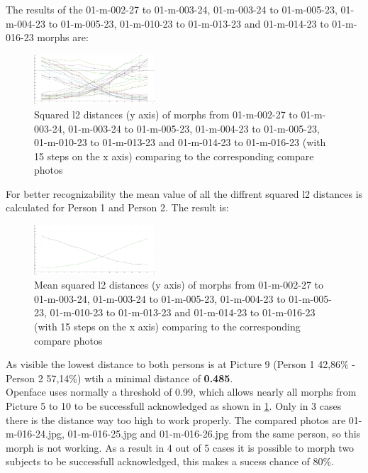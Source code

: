 The results of the 01-m-002-27 to 01-m-003-24, 01-m-003-24 to 01-m-005-23, 01-m-004-23 to 01-m-005-23, 01-m-010-23 to 01-m-013-23 and 01-m-014-23 to 01-m-016-23 morphs are:
\begin{figure}[htbp] 
	\centering
	\includegraphics[width=0.4\textwidth]{Resources/result1-5.jpg}
	\caption{Squared l2 distances (y axis) of morphs from 01-m-002-27 to 01-m-003-24, 01-m-003-24 to 01-m-005-23, 01-m-004-23 to 01-m-005-23, 01-m-010-23 to 01-m-013-23 and 01-m-014-23 to 01-m-016-23 (with 15 steps on the x axis) comparing to the corresponding compare photos}
	\label{fig:Result1-5}
\end{figure}

For better recognizability the mean value of all the diffrent squared l2 distances is calculated for Person 1 and Person 2. The result is:
\begin{figure}[htbp] 
	\centering
	\includegraphics[width=0.4\textwidth]{Resources/result1-5-mean.jpg}
	\caption{Mean squared l2 distances (y axis) of morphs from 01-m-002-27 to 01-m-003-24, 01-m-003-24 to 01-m-005-23, 01-m-004-23 to 01-m-005-23, 01-m-010-23 to 01-m-013-23 and 01-m-014-23 to 01-m-016-23 (with 15 steps on the x axis) comparing to the corresponding compare photos}
	\label{fig}
\end{figure}
As visible the lowest distance to both persons is at Picture 9 (Person 1 42,86\% - Person 2 57,14\%) wtih a minimal distance of \textbf{0.485}.\\

Openface uses normally a threshold of 0.99, which allows nearly all morphs from Picture 5 to 10 to be successfull acknowledged as shown in \ref{fig:Result1-5}. Only in 3 cases there is the distance way too high to work properly. The compared photos are 01-m-016-24.jpg, 01-m-016-25.jpg and 01-m-016-26.jpg from the same person, so this morph is not working. As a result in 4 out of 5 cases it is possible to morph two subjects to be successfull acknowledged, this makes a sucess chance of 80\%.